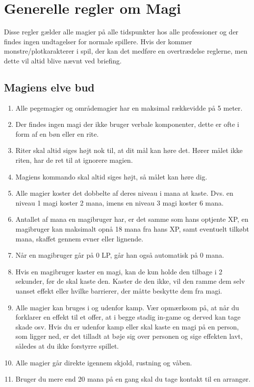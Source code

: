 \section{Generelle regler om Magi}
Disse regler gælder alle magier på alle tidspunkter hos alle professioner og der findes ingen undtagelser for normale spillere. Hvis der kommer monstre/plotkarakterer i spil, der kan det medføre en overtrædelse reglerne, men dette vil altid blive nævnt ved briefing.\\
\subsection{Magiens elve bud}
\begin{enumerate}
    \item Alle pegemagier og områdemagier har en maksimal rækkevidde på 5 meter.
    \item Der findes ingen magi der ikke bruger verbale komponenter, dette er ofte i form af en bøn eller en rite.
    \item Riter skal altid siges højt nok til, at dit mål kan høre det. Hører målet ikke riten, har de ret til at ignorere magien.
    \item Magiens kommando skal altid siges højt, så målet kan høre dig.
    \item Alle magier koster det dobbelte af deres niveau i mana at kaste. Dvs. en niveau 1 magi koster 2 mana, imens en niveau 3 magi koster 6 mana.
    \item Antallet af mana en magibruger har, er det samme som hans optjente XP, en magibruger kan maksimalt opnå 18 mana fra hans XP, samt eventuelt tilkøbt mana, skaffet gennem evner eller lignende. 
    \item Når en magibruger går på 0 LP, går han også automatisk på 0 mana.
    \item Hvis en magibruger kaster en magi, kan de kun holde den tilbage i 2 sekunder, før de skal kaste den. Kaster de den ikke, vil den ramme dem selv uanset effekt eller hvilke barrierer, der måtte beskytte dem fra magi.
    \item Alle magier kan bruges i og udenfor kamp. Vær opmærksom på, at når du forklarer en effekt til et offer, at i begge stadig in-game og derved kan tage skade osv. Hvis du er udenfor kamp eller skal kaste en magi på en person, som ligger ned, er det tilladt at bøje sig over personen og sige effekten lavt, således at du ikke forstyrre spillet.
    \item Alle magier går direkte igennem skjold, rustning og våben.
    \item Bruger du mere end 20 mana på en gang skal du tage kontakt til en arrangør.
\end{enumerate}

